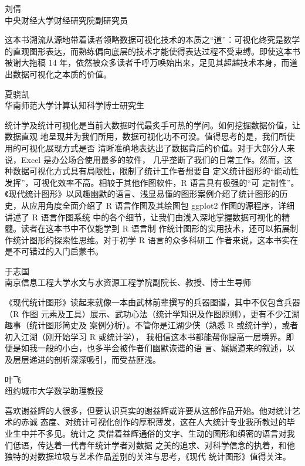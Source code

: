 \documentclass[
  b5paper,
  UTF8,twoside]{book}
\begin{document}
\begin{flushright}
刘倩\\
中央财经大学财经研究院副研究员
\end{flushright}

这本书溯流从源地带着读者领略数据可视化技术的本质之``道''：可视化终究是数学的直观图形表达，而熟练偏向底层的技术才能使得表达过程不受束缚。即使这本书被谢大拖稿 14 年，依然被众多读者千呼万唤始出来，足见其超越技术本身，而道出数据可视化之本质的价值。

\begin{flushright}
夏骁凯\\
华南师范大学计算认知科学博士研究生
\end{flushright}

统计学及统计可视化是当前大数据时代最炙手可热的学问。如何挖掘数据价值，让数据直观 地呈现并为我们所用，数据可视化功不可没。值得思考的是，我们所使用的可视化展现方式是否 清晰准确地表达出了数据背后的价值。对于大部分人来说，Excel 是办公场合使用最多的软件， 几乎垄断了我们的日常工作。然而，这种数据可视化方式具有局限性，限制了统计工作者想要自 定义统计图形的``能动性发挥''，可视化效率不高。相较于其他作图软件，R 语言具有极强的``可 定制性''。《现代统计图形》以风趣幽默的语言、浅显易懂的图形案例介绍了统计图形的历史，从应用角度全面介绍了 R 语言作图及其绘图包 ggplot2 作图的源程序，详细讲述了 R 语言作图系统 中的各个细节，让我们由浅入深地掌握数据可视化的精髓。读者在这本书中不仅能学到 R 语言制 作统计图形的实用技术，还可以拓展制作统计图形的探索性思维。对于初学 R 语言的众多科研工 作者来说，这本书实在是不可错过的入门启蒙书。

\begin{flushright}
于志国\\
南京信息工程大学水文与水资源工程学院副院长、教授、博士生导师
\end{flushright}

《现代统计图形》读起来就像一本由武林前辈撰写的兵器图谱，其中不仅包含兵器（R 作图 元素及工具）展示、武功心法（统计学知识及作图原则），更有不少江湖趣事（统计图形简史及 案例分析）。不管你是江湖少侠（熟悉 R 或统计学），或者初入江湖（刚开始学习 R 或统计学）， 我相信这本书都能帮你提高一层境界。即便是如我一般的小白，也多半会被作者们幽默诙谐的语 言、娓娓道来的叙述，以及层层递进的剖析深深吸引，而受益匪浅。

\begin{flushright}
叶飞\\
纽约城市大学数学助理教授
\end{flushright}

喜欢谢益辉的人很多，但要认识真实的谢益辉或许要从这部作品开始。他对统计艺术的赤诚 态度、对统计可视化创作的厚积薄发，这在人大统计专业我所教过的毕业生中并不多见。统计之 灵借着益辉通俗的文字、生动的图形和缜密的语言对我们低语，传达着一代青年统计学者对数据 之美的追求、对科学信念的执着，和他独特的对数据垃圾与艺术作品差别的关注与思考，《现代 统计图形》值得关注。
\end{document}
